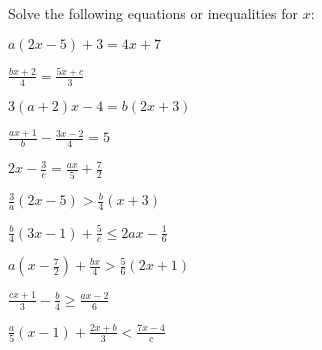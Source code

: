 \documentclass[10pt]{exam}
\begin{document}
Solve the following equations or inequalities for \(x\):

\begin{questions}
\begin{multicols}{2}

\question
\( \displaystyle a(2x - 5) + 3 = 4x + 7 \)

\vspace*{1.4in}

\question
\( \displaystyle \frac{bx + 2}{4} = \frac{5x + c}{3} \)

\vspace*{1.4in}

\question
\( \displaystyle 3(a + 2)x - 4 = b(2x + 3) \)

\vspace*{1.4in}

\question
\( \displaystyle \frac{ax + 1}{b} - \frac{3x - 2}{4} = 5 \)

\vspace*{1.4in}

\question
\( \displaystyle 2x - \frac{3}{c} = \frac{ax}{5} + \frac{7}{2} \)

\vspace{1.4in}

\question
\( \displaystyle \frac{3}{a}(2x - 5) > \frac{b}{4}(x + 3) \)

\vspace*{1.4in}

\question
\( \displaystyle \frac{b}{4}(3x - 1) + \frac{5}{c} \leq 2ax - \frac{1}{6} \)

\vspace*{1.4in}

\question
\( \displaystyle a(x - \frac{7}{2}) + \frac{bx}{4} > \frac{5}{6}(2x + 1) \)

\vspace*{1.4in}

\question
\( \displaystyle \frac{cx + 1}{3} - \frac{b}{4} \geq \frac{ax - 2}{6} \)

\vspace*{1.4in}

\question
\( \displaystyle \frac{a}{5}(x - 1) + \frac{2x + b}{3} < \frac{7x - 4}{c} \)

\vspace{1.4in}

\end{multicols}
\end{questions}

\newpage
\end{document}
